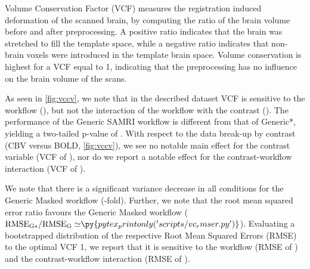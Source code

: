 Volume Conservation Factor (VCF) \cite{ioanas_optimized_2019} measures the registration induced deformation of the scanned brain, by computing the ratio of the brain volume before and after preprocessing.
A positive ratio indicates that the brain was stretched to fill the template space, while a negative ratio indicates that non-brain voxels were introduced in the template brain space.
Volume conservation is highest for a VCF equal to 1, indicating that the preprocessing has no influence on the brain volume of the scans.

As seen in \cref{fig:vccv}, we note that in the described dataset VCF is sensitive to the workflow
(),
but not the interaction of the workflow with the contrast ().
The performance of the Generic SAMRI workflow is different from that of Generic*, yielding a two-tailed p-value of .
With respect to the data break-up by contrast (CBV versus BOLD, \cref{fig:vccv}), we see no notable main effect for the contrast variable
(VCF of ), nor do we report a notable effect for the contrast-workflow interaction (VCF of ).

We note that there is a significant variance decrease in all conditions for the Generic Masked workflow
(-fold).
Further, we note that the root mean squared error ratio favours the Generic Masked workflow
($\mathrm{RMSE_{G*}/RMSE_{G}\simeq} \py{pytex_printonly('scripts/vc_rmser.py')}$).
Evaluating a bootstrapped distribution of the respective Root Mean Squared Errors (RMSE) to the optimal VCF 1, we report that it is sensitive to the
workflow (RMSE of )
and the contrast-workflow interaction (RMSE of ).

